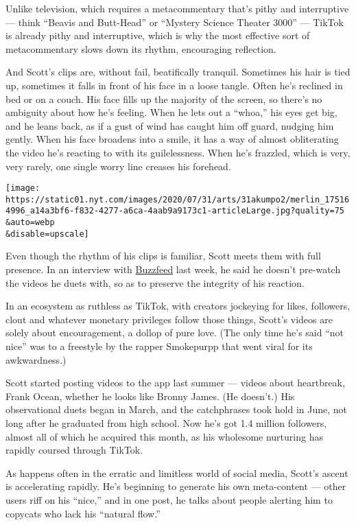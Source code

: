 Unlike television, which requires a metacommentary that's pithy and
interruptive --- think ``Beavis and Butt-Head'' or ``Mystery Science
Theater 3000'' --- TikTok is already pithy and interruptive, which is
why the most effective sort of metacommentary slows down its rhythm,
encouraging reflection.

And Scott's clips are, without fail, beatifically tranquil. Sometimes
his hair is tied up, sometimes it falls in front of his face in a loose
tangle. Often he's reclined in bed or on a couch. His face fills up the
majority of the screen, so there's no ambiguity about how he's feeling.
When he lets out a ``whoa,'' his eyes get big, and he leans back, as if
a gust of wind has caught him off guard, nudging him gently. When his
face broadens into a smile, it has a way of almost obliterating the
video he's reacting to with its guilelessness. When he's frazzled, which
is very, very rarely, one single worry line creases his forehead.

\texttt{[image: https://static01.nyt.com/images/2020/07/31/arts/31akumpo2/merlin\_175164996\_a14a3bf6-f832-4277-a6ca-4aab9a9173c1-articleLarge.jpg?quality=75\\\&auto=webp\\\&disable=upscale]}

Even though the rhythm of his clips is familiar, Scott meets them with
full presence. In an interview with
\href{https://www.buzzfeednews.com/article/tanyachen/a-teen-has-become-famous-on-tiktok-simply-for-saying-whoa}{Buzzfeed}
last week, he said he doesn't pre-watch the videos he duets with, so as
to preserve the integrity of his reaction.

In an ecosystem as ruthless as TikTok, with creators jockeying for
likes, followers, clout and whatever monetary privileges follow those
things, Scott's videos are solely about encouragement, a dollop of pure
love. (The only time he's said ``not nice'' was to a freestyle by the
rapper Smokepurpp that went viral for its awkwardness.)

Scott started posting videos to the app last summer --- videos about
heartbreak, Frank Ocean, whether he looks like Bronny James. (He
doesn't.) His observational duets began in March, and the catchphrases
took hold in June, not long after he graduated from high school. Now
he's got 1.4 million followers, almost all of which he acquired this
month, as his wholesome nurturing has rapidly coursed through TikTok.

As happens often in the erratic and limitless world of social media,
Scott's ascent is accelerating rapidly. He's beginning to generate his
own meta-content --- other users riff on his ``nice,'' and in one post,
he talks about people alerting him to copycats who lack his ``natural
flow.''

